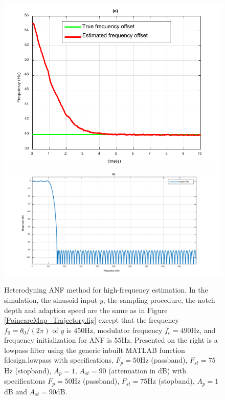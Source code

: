 \documentclass{UCF_ETD}
\begin{document}
\begin{figure}[H]
\begin{center}
\includegraphics[scale=0.8]{NonuniformANF/HighFreqEst1} %
\includegraphics[scale=0.5]{NonuniformANF/LowPassDesign} %
\caption{Heterodyning ANF method for high-frequency estimation. In the simulation, the sinusoid input $y$, the sampling  procedure, the notch  depth  and adaption speed
are the same as in Figure \ref{PoincareMap_Trajectory.fig}  except that
the frequency $f_0=\theta_0/(2\pi)$ of $y$ is $450$Hz,
 modulator frequency $f_c= 490$Hz, and frequency initialization for ANF is $55$Hz.
 Presented on the right is  a lowpass filter using the generic inbuilt MATLAB function fdesign.lowpass with specifications, $F_p = 50$Hz (passband), $F_{st} = 75$Hz (stopband), $A_p = 1$, $A_{st} = 90$ (attenuation in dB)
 with  specifications $F_p = 50$Hz (passband), $F_{st} = 75$Hz (stopband), $A_p = 1$dB and $A_{st} = 90$dB. %
 }
\label{FrequencyOffsetEstimation.fig}
\end{center}
\end{figure}
\end{document}
